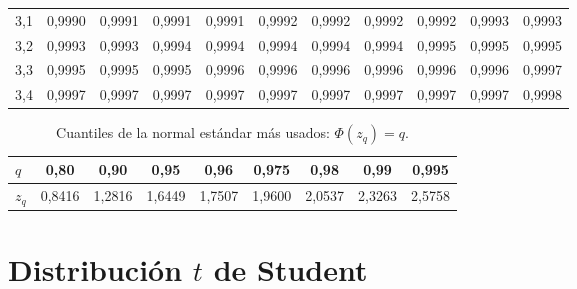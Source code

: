 \begin{table}[ht]
\begin{tabular}{@{}c|cccccccccc@{}}
3{,}1 & 0{,}9990 & 0{,}9991 & 0{,}9991 & 0{,}9991 & 0{,}9992 & 0{,}9992 & 0{,}9992 & 0{,}9992 & 0{,}9993 & 0{,}9993 \\
3{,}2 & 0{,}9993 & 0{,}9993 & 0{,}9994 & 0{,}9994 & 0{,}9994 & 0{,}9994 & 0{,}9994 & 0{,}9995 & 0{,}9995 & 0{,}9995 \\
3{,}3 & 0{,}9995 & 0{,}9995 & 0{,}9995 & 0{,}9996 & 0{,}9996 & 0{,}9996 & 0{,}9996 & 0{,}9996 & 0{,}9996 & 0{,}9997 \\
3{,}4 & 0{,}9997 & 0{,}9997 & 0{,}9997 & 0{,}9997 & 0{,}9997 & 0{,}9997 & 0{,}9997 & 0{,}9997 & 0{,}9997 & 0{,}9998 \\
\bottomrule
\end{tabular}
\end{table}

\begin{table}[ht]
\centering\small
\caption{Cuantiles de la normal estándar más usados: $\Phi(z_q)=q$.}\label{tab:zq}
\begin{tabular}{@{}lcccccccc@{}}
\toprule
$q$ & 0{,}80 & 0{,}90 & 0{,}95 & 0{,}96 & 0{,}975 & 0{,}98 & 0{,}99 & 0{,}995 \\
\midrule
$z_q$ & 0{,}8416 & 1{,}2816 & 1{,}6449 & 1{,}7507 & 1{,}9600 & 2{,}0537 & 2{,}3263 & 2{,}5758 \\
\bottomrule
\end{tabular}
\end{table}

\section{Distribución \texorpdfstring{$t$}{t} de Student}

